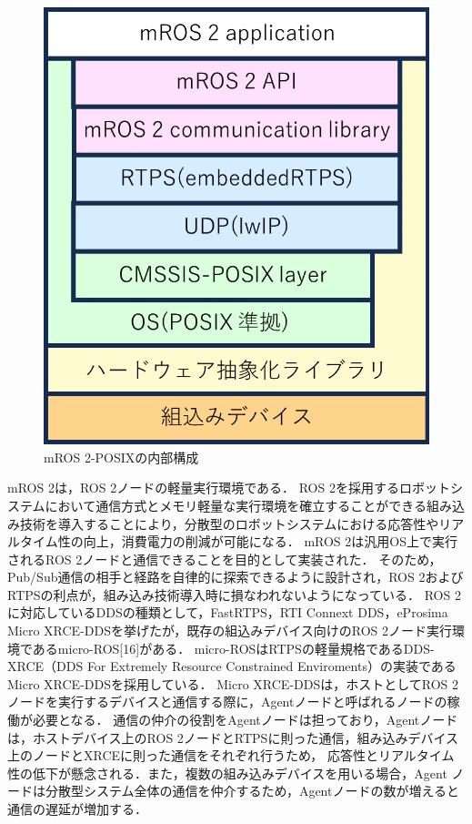\begin{figure}[ht]
\begin{minipage}{.48\textwidth}
        \includegraphics[width=0.9\linewidth]{images/fig1_mros2posix_a.png}
        \caption{mROS 2-POSIXの内部構成}
        \label{fig:subfig_b}
    \end{minipage}
\end{figure}
mROS 2は，ROS 2ノードの軽量実行環境である．
ROS 2を採用するロボットシステムにおいて通信方式とメモリ軽量な実行環境を確立することができる組み込み技術を導入することにより，分散型のロボットシステムにおける応答性やリアルタイム性の向上，消費電力の削減が可能になる．
mROS 2は汎用OS上で実行されるROS 2ノードと通信できることを目的として実装された．
そのため，Pub/Sub通信の相手と経路を自律的に探索できるように設計され，ROS 2およびRTPSの利点が，組み込み技術導入時に損なわれないようになっている．
ROS 2に対応しているDDSの種類として，FastRTPS，RTI Connext DDS，eProsima Micro XRCE-DDSを挙げたが，既存の組込みデバイス向けのROS 2ノード実行環境であるmicro-ROS[16]がある．
micro-ROSはRTPSの軽量規格であるDDS-XRCE（DDS For Extremely Resource Constrained Enviroments）の実装であるMicro XRCE-DDSを採用している．
Micro XRCE-DDSは，ホストとしてROS 2ノードを実行するデバイスと通信する際に，Agentノードと呼ばれるノードの稼働が必要となる．
通信の仲介の役割をAgentノードは担っており，Agentノードは，ホストデバイス上のROS 2ノードとRTPSに則った通信，組み込みデバイス上のノードとXRCEに則った通信をそれぞれ行うため，
応答性とリアルタイム性の低下が懸念される．また，複数の組み込みデバイスを用いる場合，Agent ノードは分散型システム全体の通信を仲介するため，Agentノードの数が増えると通信の遅延が増加する．
